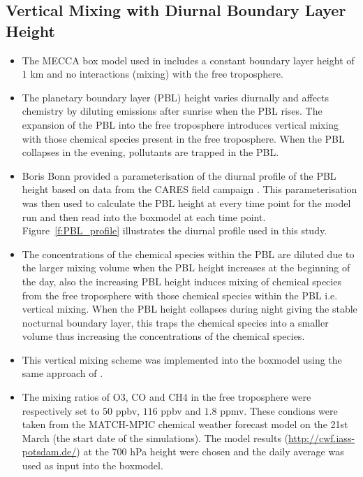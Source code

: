 \subsection{Vertical Mixing with Diurnal Boundary Layer Height} \label{ss:vertical_mixing}
\begin{itemize}
    \item The MECCA box model used in \citet{Coates:2015} includes a constant boundary layer height of $1$ km and no interactions (mixing) with the free troposphere.
    \item The planetary boundary layer (PBL) height varies diurnally and affects chemistry by diluting emissions after sunrise when the PBL rises. The expansion of the PBL into the free troposphere introduces vertical mixing with those chemical species present in the free troposphere. When the PBL collapses in the evening, pollutants are trapped in the PBL.
    \item Boris Bonn provided a parameterisation of the diurnal profile of the PBL height based on data from the CARES field campaign \citep{CARES:2008} . This parameterisation was then used to calculate the PBL height at every time point for the model run and then read into the boxmodel at each time point. Figure~\ref{f:PBL_profile} illustrates the diurnal profile used in this study.
    \item The concentrations of the chemical species within the PBL are diluted due to the larger mixing volume when the PBL height increases at the beginning of the day, also the increasing PBL height induces mixing of chemical species from the free troposphere with those chemical species within the PBL i.e. vertical mixing. When the PBL height collapses during night giving the stable nocturnal boundary layer, this traps the chemical species into a smaller volume thus increasing the concentrations of the chemical species.
    \item This vertical mixing scheme was implemented into the boxmodel using the same approach of \citet{Lourens:2012}.
    \item The mixing ratios of O3, CO and CH4 in the free troposphere were respectively set to $50$ ppbv, $116$ ppbv and $1.8$ ppmv. These condions were taken from the MATCH-MPIC chemical weather forecast model on the 21st March (the start date of the simulations). The model results (\url{http://cwf.iass-potsdam.de/}) at the 700 hPa height were chosen and the daily average was used as input into the boxmodel. 
\end{itemize}
